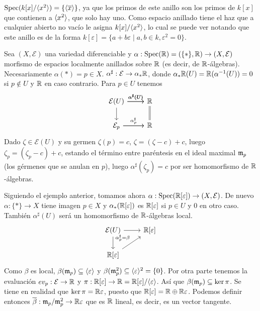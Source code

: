 \documentclass[GA.tex]{subfiles}
\begin{document}
\begin{ej}
$\operatorname{Spec}(k[x]/\langle{x^2}\rangle)=\{\langle{\overline{x}}\rangle\}$, ya que los primos de este anillo son los primos de $k[x]$ que contienen a $\langle{x^2}\rangle$, que solo hay uno.  Como espacio anillado tiene el haz que a cualquier abierto no vacío le asigna $k[x]/\langle{x^2}\rangle$, lo cual se puede ver notando que este anillo es de la forma $k[\varepsilon]=\{a+b\varepsilon\mid a,b\in k, \varepsilon^2=0\}$.
\end{ej}

\begin{ej}
Sea $(X,\mathcal{E})$ una variedad diferenciable y $\alpha:\operatorname{Spec}(\mathbb{R})=(\{*\},\mathbb{R})\to (X,\mathcal{E})$ morfismo de espacios localmente anillados sobre $\mathbb{R}$ (es decir, de $\mathbb{R}$-álgebras). Necesariamente $\alpha(*)=p\in X$. $\alpha^{\sharp}:\mathcal{E}\to\alpha_*\mathbb{R}$, donde $\alpha_*\mathbb{R}(U)=\mathbb{R}(\alpha^{-1}(U))=0$ si $p\notin U$ y $\mathbb{R}$ en caso contrario. Para $p\in U$ tenemos
\[
\begin{tikzcd}
\mathcal{E}(U)\arrow[r, "\alpha^{\sharp}(U)"]\arrow[r, "\alpha^{\sharp}(U)"]\arrow[d]& \R\arrow[d, equals]\\
\mathcal{E}_p\arrow[r, "\alpha^{\sharp}_p"]\arrow[r] & \R
\end{tikzcd}
\]
Dado $\zeta\in \mathcal{E}(U)$ y su germen $\zeta(p)=c$, $\zeta=(\zeta-c)+c$, luego $\zeta_p=(\zeta_p-c)+c$, estando el término entre paréntesis en el ideal maximal ${\mathfrak{m}}_p$ (los gérmenes que se anulan en $p$), luego $\alpha^{\sharp}(\zeta_p)=c$ por ser homomorfismo de $\mathbb{R}$-álgebras. 
\end{ej}

\begin{ej}
Siguiendo el ejemplo anterior, tomamos ahora $\alpha:\operatorname{Spec}(\mathbb{R}[\varepsilon])\to (X,\mathcal{E})$. De nuevo $\alpha:\{*\}\to X$ tiene imagen $p\in X$ y $\alpha_*(\mathbb{R}[\varepsilon])$ es $\mathbb{R}[\varepsilon]$ si $p\in U$ y 0 en otro caso. También $\alpha^{\sharp}(U)$ será un homomorfismo de $\mathbb{R}$-álgebras local. 
\[
\begin{tikzcd}
\mathcal{E}(U)\arrow[r] \arrow[d] &\R[\varepsilon]\\
\R[\varepsilon]\arrow[ur, "\alpha^{\sharp}_p=\beta"]&
\end{tikzcd}
\]
Como $\beta$ es local, $\beta({\mathfrak{m}}_p)\subseteq\langle{\varepsilon}\rangle$ y $\beta({\mathfrak{m}}^2_p)\subseteq\langle{\varepsilon}\rangle^2=\{0\}$. Por otra parte tenemos la evaluación $ev_p:\mathcal{E}\to \mathbb{R}$ y $\pi:\mathbb{R}[\varepsilon]\to \mathbb{R}=\mathbb{R}[\varepsilon]/\langle{\varepsilon}\rangle$. Así que $\beta({\mathfrak{m}}_p)\subseteq\ker\pi$. Se tiene en realidad que $\ker\pi=\mathbb{R}\varepsilon$, puesto que $\mathbb{R}[\varepsilon]=\mathbb{R}\oplus\mathbb{R}\varepsilon$. Podemos definir entonces $\overline{\beta}:{\mathfrak{m}}_p/{\mathfrak{m}}^2_p\to\mathbb{R}\varepsilon$ que es $\mathbb{R}$ lineal, es decir, es un vector tangente. 
\end{ej}
\end{document}

